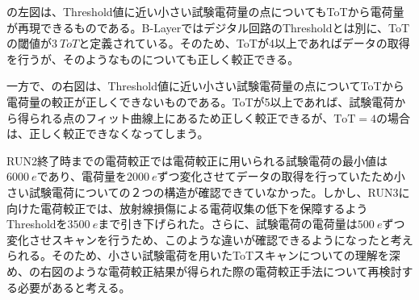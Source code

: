 の左図は、Threshold値に近い小さい試験電荷量の点についてもToTから電荷量が再現できるものである。B-Layerではデジタル回路のThresholdとは別に、ToTの閾値が$3\ \si{ToT}$と定義されている。そのため、ToTが4以上であればデータの取得を行うが、そのようなものについても正しく較正できる。

一方で、の右図は、Threshold値に近い小さい試験電荷量の点についてToTから電荷量の較正が正しくできないものである。ToTが5以上であれば、試験電荷から得られる点のフィット曲線上にあるため正しく較正できるが、$\mathrm{ToT}=4$の場合は、正しく較正できなくなってしまう。

RUN2終了時までの電荷較正では電荷較正に用いられる試験電荷の最小値は$6000\ \si{e}$であり、電荷量を$2000\ \si{e}$ずつ変化させてデータの取得を行っていたため小さい試験電荷についての２つの構造が確認できていなかった。しかし、RUN3に向けた電荷較正では、放射線損傷による電荷収集の低下を保障するようThresholdを$3500\ \si{e}$まで引き下げられた。さらに、試験電荷の電荷量は$500\ \si{e}$ずつ変化させスキャンを行うため、このような違いが確認できるようになったと考えられる。そのため、小さい試験電荷を用いたToTスキャンについての理解を深め、の右図のような電荷較正結果が得られた際の電荷較正手法について再検討する必要があると考える。


\newpage
